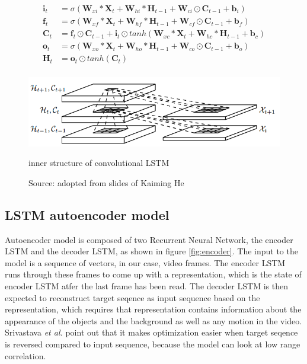 \documentclass[twoside,a4paper,article]{combine}
\begin{document}
\begin{align*}
    \mathbf{i}_t &= \sigma(\mathbf{W}_{xi} \ast \mathbf{X}_t + 
                        \mathbf{W}_{hi} \ast \mathbf{H}_{t-1} + \mathbf{W}_{ci} \odot \mathbf{C}_{t-1}+ \mathbf{b}_i) \\
    \mathbf{f}_t &= \sigma(\mathbf{W}_{xf} \ast \mathbf{X}_t + 
                        \mathbf{W}_{hf} \ast \mathbf{H}_{t-1} + \mathbf{W}_{cf} \odot \mathbf{C}_{t-1}+ \mathbf{b}_f) \\
    \mathbf{C}_t &= \mathbf{f}_t \odot \mathbf{C}_{t-1} + \mathbf{i}_t \odot tanh(\mathbf{W}_{xc} \ast \mathbf{X}_t +
                        \mathbf{W}_{hc} \ast \mathbf{H}_{t-1} + \mathbf{b}_c) \\
    \mathbf{o}_t &= \sigma(\mathbf{W}_{xo}\ast\mathbf{X}_t + 
                        \mathbf{W}_{ho}\ast\mathbf{H}_{t-1} + \mathbf{W}_{co}\odot\mathbf{C}_{t-1}+ \mathbf{b}_o) \\
    \mathbf{H}_t &= \mathbf{o}_t \odot tanh(\mathbf{C}_t) \\
\end{align*}


\begin{figure}[ht!]
    \includegraphics[width=\linewidth]{convlstm}
    \caption{inner structure of convolutional LSTM}
    \caption*{Source: adopted from slides of Kaiming He}
    \label{fig:convlstm}
\end{figure}

\subsection{LSTM autoencoder model}
Autoencoder model is composed of two Recurrent Neural Network, the encoder LSTM and the decoder LSTM, as shown in figure \ref{fig:encoder}.
The input to the model is a sequence of vectors, in our case, video frames. The encoder LSTM runs through these frames to come up with a
representation, which is the state of encoder LSTM atfer the last frame has been read. The decoder LSTM is then expected to reconstruct
target seqence as input sequence based on the representation, which requires that representation contains information about the
appearance of the objects and the background as well as any motion in the video. Srivastava \emph{et al.} point out that it makes
optimization easier when target seqence is reversed compared to input sequence, because the model can look at low range correlation. 
\end{document}
